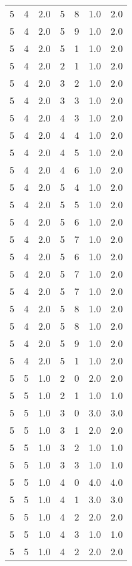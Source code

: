 \documentclass[a4paper,12pt]{article}
\begin{document}
\begin{center}
\begin{longtable}{ c c c | c c c | c }
        5 & 4 & 2.0 & 5 & 8 & 1.0 & 2.0 \\
        5 & 4 & 2.0 & 5 & 9 & 1.0 & 2.0 \\
        5 & 4 & 2.0 & 5 & 1 & 1.0 & 2.0 \\
        5 & 4 & 2.0 & 2 & 1 & 1.0 & 2.0 \\
        5 & 4 & 2.0 & 3 & 2 & 1.0 & 2.0 \\
        5 & 4 & 2.0 & 3 & 3 & 1.0 & 2.0 \\
        5 & 4 & 2.0 & 4 & 3 & 1.0 & 2.0 \\
        5 & 4 & 2.0 & 4 & 4 & 1.0 & 2.0 \\
        5 & 4 & 2.0 & 4 & 5 & 1.0 & 2.0 \\
        5 & 4 & 2.0 & 4 & 6 & 1.0 & 2.0 \\
        5 & 4 & 2.0 & 5 & 4 & 1.0 & 2.0 \\
        5 & 4 & 2.0 & 5 & 5 & 1.0 & 2.0 \\
        5 & 4 & 2.0 & 5 & 6 & 1.0 & 2.0 \\
        5 & 4 & 2.0 & 5 & 7 & 1.0 & 2.0 \\
        5 & 4 & 2.0 & 5 & 6 & 1.0 & 2.0 \\
        5 & 4 & 2.0 & 5 & 7 & 1.0 & 2.0 \\
        5 & 4 & 2.0 & 5 & 7 & 1.0 & 2.0 \\
        5 & 4 & 2.0 & 5 & 8 & 1.0 & 2.0 \\
        5 & 4 & 2.0 & 5 & 8 & 1.0 & 2.0 \\
        5 & 4 & 2.0 & 5 & 9 & 1.0 & 2.0 \\
        5 & 4 & 2.0 & 5 & 1 & 1.0 & 2.0 \\
        5 & 5 & 1.0 & 2 & 0 & 2.0 & 2.0 \\
        5 & 5 & 1.0 & 2 & 1 & 1.0 & 1.0 \\
        5 & 5 & 1.0 & 3 & 0 & 3.0 & 3.0 \\
        5 & 5 & 1.0 & 3 & 1 & 2.0 & 2.0 \\
        5 & 5 & 1.0 & 3 & 2 & 1.0 & 1.0 \\
        5 & 5 & 1.0 & 3 & 3 & 1.0 & 1.0 \\
        5 & 5 & 1.0 & 4 & 0 & 4.0 & 4.0 \\
        5 & 5 & 1.0 & 4 & 1 & 3.0 & 3.0 \\
        5 & 5 & 1.0 & 4 & 2 & 2.0 & 2.0 \\
        5 & 5 & 1.0 & 4 & 3 & 1.0 & 1.0 \\
        5 & 5 & 1.0 & 4 & 2 & 2.0 & 2.0 \\

\end{longtable}
\end{center}
\end{document}
